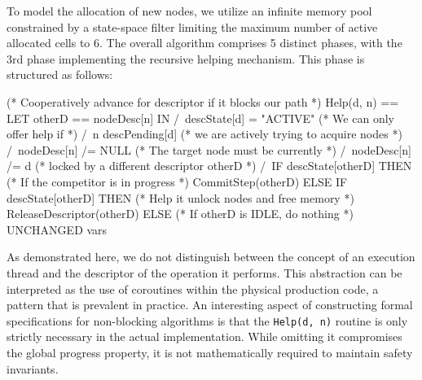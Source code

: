 To model the allocation of new nodes, we utilize an infinite memory pool constrained by a state-space filter limiting the maximum number of active allocated cells to 6. The overall algorithm comprises 5 distinct phases, with the 3rd phase implementing the recursive helping mechanism. This phase is structured as follows:

\begin{tla}
(* Cooperatively advance for descriptor if it blocks our path *)
Help(d, n) == LET otherD == nodeDesc[n] IN
  /\ descState[d] = "ACTIVE" (* We can only offer help if *)
  /\ n \in descPending[d]    (* we are actively trying to acquire nodes *)
  /\ nodeDesc[n] /= NULL (* The target node must be currently *)
  /\ nodeDesc[n] /= d    (* locked by a different descriptor otherD *)
  /\ IF descState[otherD] 
     THEN (* If the competitor is in progress *)
        CommitStep(otherD)
     ELSE IF descState[otherD] 
     THEN (* Help it unlock nodes and free memory *)
        ReleaseDescriptor(otherD)
     ELSE (* If otherD is IDLE, do nothing *)
        UNCHANGED vars
\end{tla}
\begin{tlatex}
\@x{}%
%
\@xx{}%
%
%
\@xx{}%
%
%
\@xx{}%
%
%
\@xx{}%
%
%
\@xx{}%
%
%
\@xx{}%
%
%
%
\@xx{}%
%
%
%
\@xx{}%
%
\end{tlatex}

As demonstrated here, we do not distinguish between the concept of an execution thread and the descriptor of the operation it performs. This abstraction can be interpreted as the use of coroutines within the physical production code, a pattern that is prevalent in practice. An interesting aspect of constructing formal specifications for non-blocking algorithms is that the \texttt{Help(d, n)} routine is only strictly necessary in the actual implementation. While omitting it compromises the global progress property, it is not mathematically required to maintain safety invariants.

